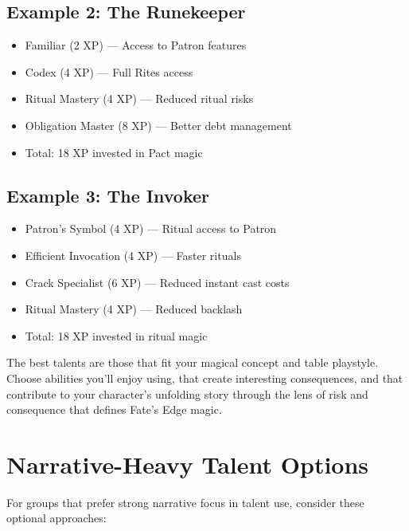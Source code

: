 \documentclass[11pt,twoside,openany]{book}
\begin{document}
\subsection*{Example 2: The Runekeeper}

\begin{itemize}
\item Familiar (2 XP) --- Access to Patron features
\item Codex (4 XP) --- Full Rites access
\item Ritual Mastery (4 XP) --- Reduced ritual risks
\item Obligation Master (8 XP) --- Better debt management
\item Total: 18 XP invested in Pact magic
\end{itemize}

\subsection*{Example 3: The Invoker}

\begin{itemize}
\item Patron's Symbol (4 XP) --- Ritual access to Patron
\item Efficient Invocation (4 XP) --- Faster rituals
\item Crack Specialist (6 XP) --- Reduced instant cast costs
\item Ritual Mastery (4 XP) --- Reduced backlash
\item Total: 18 XP invested in ritual magic
\end{itemize}

\begin{tcolorbox}[colback=gray!5!white, colframe=gray!75!black, title=Final Note, fonttitle=\bfseries,breakable]
The best talents are those that fit your magical concept and table playstyle. Choose abilities you'll enjoy using, that create interesting consequences, and that contribute to your character's unfolding story through the lens of risk and consequence that defines Fate's Edge magic.
\end{tcolorbox}

\section*{Narrative-Heavy Talent Options} 

For groups that prefer strong narrative focus in talent use, consider these optional approaches:
\end{document}
